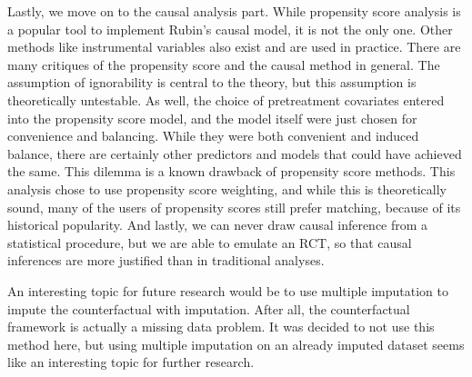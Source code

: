 Lastly, we move on to the causal analysis part. While propensity score analysis is a popular tool to implement Rubin's causal model, it is not the only one. Other methods like instrumental variables also exist and are used in practice. There are many critiques of the propensity score and the causal method in general. The assumption of ignorability is central to the theory, but this assumption is theoretically untestable. As well, the choice of pretreatment covariates entered into the propensity score model, and the model itself were just chosen for convenience and balancing. While they were both convenient and induced balance, there are certainly other predictors and models that could have achieved the same. This dilemma is a known drawback of propensity score methods. This analysis chose to use propensity score weighting, and while this is theoretically sound, many of the users of propensity scores still prefer matching, because of its historical popularity. And lastly, we can never draw causal inference from a statistical procedure, but we are able to emulate an RCT, so that causal inferences are more justified than in traditional analyses.

An interesting topic for future research would be to use multiple imputation to impute the counterfactual with imputation. After all, the counterfactual framework is actually a missing data problem. It was decided to not use this method here, but using multiple imputation on an already imputed dataset seems like an interesting  topic for further research.
